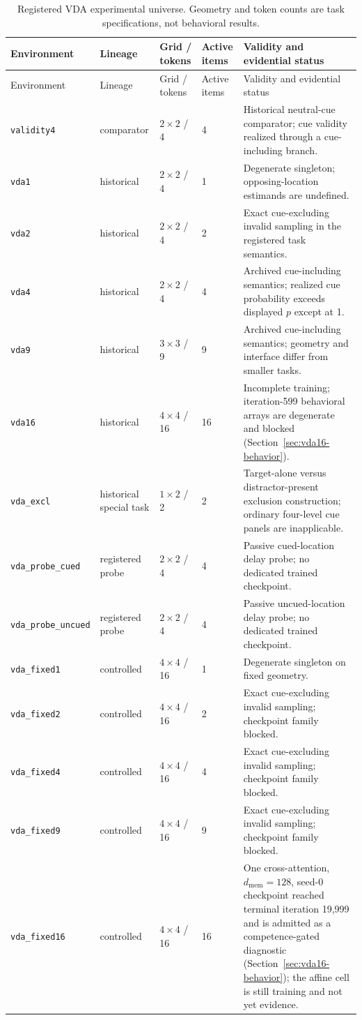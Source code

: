 \documentclass[11pt,a4paper]{article}
\newcommand{\env}[1]{\texttt{#1}}
\begin{document}
\begingroup\small
\begin{longtable}{@{}>{\RaggedRight\arraybackslash}p{3.2cm}p{2.2cm}p{2.3cm}p{2.0cm}p{5.4cm}@{}}
\caption{Registered VDA experimental universe. Geometry and token counts are task specifications, not behavioral results.}\label{tab:environments}\\
\toprule
Environment & Lineage & Grid / tokens & Active items & Validity and evidential status\\
\midrule\endfirsthead
\toprule Environment & Lineage & Grid / tokens & Active items & Validity and evidential status\\\midrule\endhead
\env{validity4} & comparator & $2\times2$ / 4 & 4 & Historical neutral-cue comparator; cue validity realized through a cue-including branch.\\
\env{vda1} & historical & $2\times2$ / 4 & 1 & Degenerate singleton; opposing-location estimands are undefined.\\
\env{vda2} & historical & $2\times2$ / 4 & 2 & Exact cue-excluding invalid sampling in the registered task semantics.\\
\env{vda4} & historical & $2\times2$ / 4 & 4 & Archived cue-including semantics; realized cue probability exceeds displayed $p$ except at 1.\\
\env{vda9} & historical & $3\times3$ / 9 & 9 & Archived cue-including semantics; geometry and interface differ from smaller tasks.\\
\env{vda16} & historical & $4\times4$ / 16 & 16 & Incomplete training; iteration-599 behavioral arrays are degenerate and blocked (Section~\ref{sec:vda16-behavior}).\\
\env{vda\_excl} & historical special task & $1\times2$ / 2 & 2 & Target-alone versus distractor-present exclusion construction; ordinary four-level cue panels are inapplicable.\\
\env{vda\_probe\_cued} & registered probe & $2\times2$ / 4 & 4 & Passive cued-location delay probe; no dedicated trained checkpoint.\\
\env{vda\_probe\_uncued} & registered probe & $2\times2$ / 4 & 4 & Passive uncued-location delay probe; no dedicated trained checkpoint.\\
\env{vda\_fixed1} & controlled & $4\times4$ / 16 & 1 & Degenerate singleton on fixed geometry.\\
\env{vda\_fixed2} & controlled & $4\times4$ / 16 & 2 & Exact cue-excluding invalid sampling; checkpoint family blocked.\\
\env{vda\_fixed4} & controlled & $4\times4$ / 16 & 4 & Exact cue-excluding invalid sampling; checkpoint family blocked.\\
\env{vda\_fixed9} & controlled & $4\times4$ / 16 & 9 & Exact cue-excluding invalid sampling; checkpoint family blocked.\\
\env{vda\_fixed16} & controlled & $4\times4$ / 16 & 16 & One cross-attention, $d_\mathrm{mem}=128$, seed-0 checkpoint reached terminal iteration 19{,}999 and is admitted as a competence-gated diagnostic (Section~\ref{sec:vda16-behavior}); the affine cell is still training and not yet evidence.\\
\bottomrule
\end{longtable}
\endgroup
\end{document}
